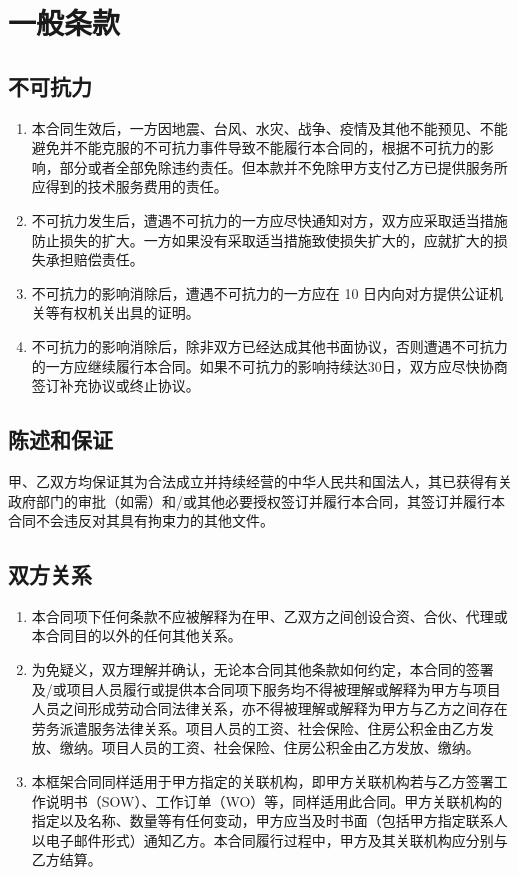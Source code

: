 \section{一般条款}

\subsection{不可抗力}
\begin{enumerate}
  \item 本合同生效后，一方因地震、台风、水灾、战争、疫情及其他不能预见、不能避免并不能克服的不可抗力事件导致不能履行本合同的，根据不可抗力的影响，部分或者全部免除违约责任。但本款并不免除甲方支付乙方已提供服务所应得到的技术服务费用的责任。
  \item 不可抗力发生后，遭遇不可抗力的一方应尽快通知对方，双方应采取适当措施防止损失的扩大。一方如果没有采取适当措施致使损失扩大的，应就扩大的损失承担赔偿责任。
  \item 不可抗力的影响消除后，遭遇不可抗力的一方应在 10 日内向对方提供公证机关等有权机关出具的证明。
  \item 不可抗力的影响消除后，除非双方已经达成其他书面协议，否则遭遇不可抗力的一方应继续履行本合同。如果不可抗力的影响持续达30日，双方应尽快协商签订补充协议或终止协议。
\end{enumerate}

\subsection{陈述和保证}
甲、乙双方均保证其为合法成立并持续经营的中华人民共和国法人，其已获得有关政府部门的审批（如需）和/或其他必要授权签订并履行本合同，其签订并履行本合同不会违反对其具有拘束力的其他文件。

\subsection{双方关系}
\begin{enumerate}
  \item 本合同项下任何条款不应被解释为在甲、乙双方之间创设合资、合伙、代理或本合同目的以外的任何其他关系。
  \item 为免疑义，双方理解并确认，无论本合同其他条款如何约定，本合同的签署及/或项目人员履行或提供本合同项下服务均不得被理解或解释为甲方与项目人员之间形成劳动合同法律关系，亦不得被理解或解释为甲方与乙方之间存在劳务派遣服务法律关系。项目人员的工资、社会保险、住房公积金由乙方发放、缴纳。项目人员的工资、社会保险、住房公积金由乙方发放、缴纳。
  \item 本框架合同同样适用于甲方指定的关联机构，即甲方关联机构若与乙方签署工作说明书（SOW）、工作订单（WO）等，同样适用此合同。甲方关联机构的指定以及名称、数量等有任何变动，甲方应当及时书面（包括甲方指定联系人以电子邮件形式）通知乙方。本合同履行过程中，甲方及其关联机构应分别与乙方结算。
\end{enumerate}

